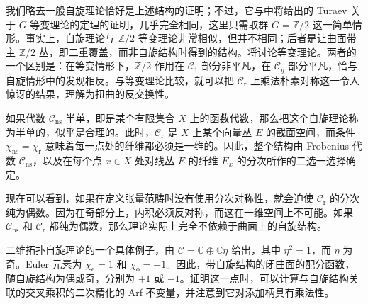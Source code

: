\begin{example}
我们略去一般自旋理论恰好是上述结构的证明；不过，它与中将给出的 Turaev 关于 $G$ 等变理论的定理的证明，几乎完全相同，这里只需取群 $G=\mathbb{Z}/2$ 这一简单情形。事实上，自旋理论与 $\mathbb{Z}/2$ 等变理论非常相似，但并不相同；后者是让曲面带主 $\mathbb{Z}/2$ 丛，即二重覆盖，而非自旋结构时得到的结构。将讨论等变理论。两者的一个区别是：在等变情形下，$\mathbb{Z}/2$ 作用在 $\mathcal{C}_1$ 部分非平凡，在 $\mathcal{C}_g$ 部分平凡，恰与自旋情形中的发现相反。与等变理论比较，就可以把 $\mathcal{C}_{\mathrm{r}}$ 上乘法朴素对称这一令人惊讶的结果，理解为扭曲的反交换性。

如果代数 $\mathcal{C}_{\mathrm{ns}}$ 半单，即是某个有限集合 $X$ 上的函数代数，那么把这个自旋理论称为半单的，似乎是合理的。此时，$\mathcal{C}_{\mathrm{r}}$ 是 $X$ 上某个向量丛 $E$ 的截面空间，而条件 $\chi_{\mathrm{ns}}=\chi_{\mathrm{r}}$ 意味着每一点处的纤维都必须是一维的。因此，整个结构由 Frobenius 代数 $\mathcal{C}_{\mathrm{ns}}$，以及在每个点 $x\in X$ 处对线丛 $E$ 的纤维 $E_x$ 的分次所作的二选一选择确定。

现在可以看到，如果在定义张量范畴时没有使用分次对称性，就会迫使 $\mathcal{C}_{\mathrm{r}}$ 的分次纯为偶数。因为在奇部分上，内积必须反对称，而这在一维空间上不可能。如果 $\mathcal{C}_{\mathrm{ns}}$ 和 $\mathcal{C}_{\mathrm{r}}$ 都纯为偶数，那么理论实际上完全不依赖于曲面上的自旋结构。

二维拓扑自旋理论的一个具体例子，由 $\mathcal{C}=\mathbb{C}\oplus\mathbb{C}\eta$ 给出，其中 $\eta^2=1$，而 $\eta$ 为奇。Euler 元素为 $\chi_{\mathrm{e}}=1$ 和 $\chi_{\mathrm{o}}=-1$。因此，带自旋结构的闭曲面的配分函数，随自旋结构为偶或奇，分别为 $+1$ 或 $-1$。证明这一点时，可以计算与自旋结构关联的交叉乘积的二次精化的 Arf 不变量，并注意到它对添加柄具有乘法性。


\end{example}
